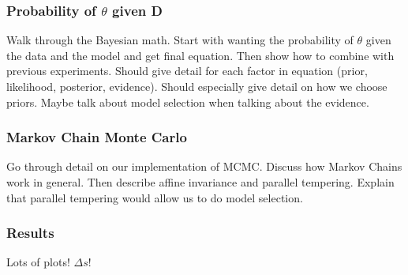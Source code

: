   \subsubsection{Probability of $\theta$ given D}
    Walk through the Bayesian math. Start with wanting the probability of
    $\theta$ given the data and the model and get final equation. Then show how
    to combine with previous experiments. Should give detail for each factor in
    equation (prior, likelihood, posterior, evidence). Should especially give
    detail on how we choose priors. Maybe talk about model selection when
    talking about the evidence.
  \subsubsection{Markov Chain Monte Carlo}
    Go through detail on our implementation of MCMC. Discuss how Markov Chains
    work in general. Then describe affine invariance and parallel tempering.
    Explain that parallel tempering would allow us to do model selection.
  \subsubsection{Results}
    Lots of plots! $\Delta s$!



